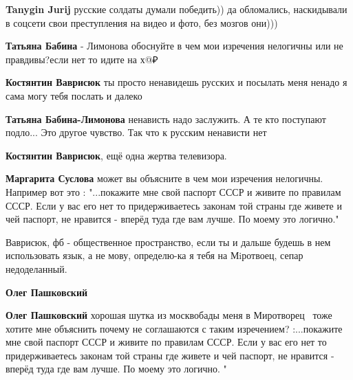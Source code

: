 \begin{itemize}
\begin{itemize}
\textbf{Tanygin Jurij} русские солдаты думали победить)) да обломались, наскидывали в соцсети свои преступления на видео и фото, без мозгов они)))

\textbf{Татьяна Бабина} - Лимонова обоснуйте в чем мои изречения нелогичны или не правдивы?если нет то идите на х@₽

\textbf{Костянтин Ваврисюк} ты просто ненавидешь русских и посылать меня ненадо я сама могу тебя послать и далеко

\textbf{Татьяна Бабина-Лимонова} ненависть надо заслужить. А те кто поступают подло... Это другое чувство. Так что к русским ненависти нет

\textbf{Костянтин Ваврисюк}, ещё одна жертва телевизора.

\textbf{Маргарита Суслова} может вы объясните в чем мои изречения нелогичны.
Например вот это : "...покажите мне свой паспорт СССР и живите по правилам
СССР. Если у вас его нет то придерживаетесь законам той страны где живете и чей
паспорт, не нравится - вперёд туда где вам лучше. По моему это логично."



Ваврисюк, фб - общественное пространство, если ты и дальше будешь в нем
использовать язык, а не мову, определю-ка я тебя на Мiротвоец, сепар
недоделанный.

\textbf{Олег Пашковский}🤣🤣🤣🤣

\textbf{Олег Пашковский} хорошая шутка из москвобады меня в
Миротворец🤣🤣🤣тоже хотите мне объяснить почему не соглашаются с таким
изречением? :...покажите мне свой паспорт СССР и живите по правилам СССР. Если
у вас его нет то придерживаетесь законам той страны где живете и чей паспорт,
не нравится - вперёд туда где вам лучше. По моему это логично. "




\end{itemize}
\end{itemize}
